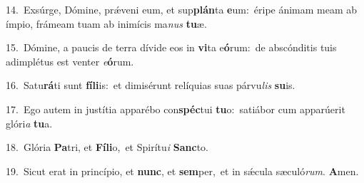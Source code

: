 {\numbfont\textcolor{\numbcolor}{14.}}~Exsúrge, Dómine, prǽveni eum, et sup\-\textbf{plán}\-ta \textbf{e}\-um:~\star éripe ánimam meam ab ímpio, frámeam tuam ab inimícis ma\textit{nus} \textbf{tu}\-æ.\par
{\numbfont\textcolor{\numbcolor}{15.}}~Dómine, a paucis de terra dívide eos in \textbf{vi}\-ta e\-\textbf{ó}\-rum:~\star de abscónditis tuis adimplétus est venter \textit{e}\-\textbf{ó}rum.\par
{\numbfont\textcolor{\numbcolor}{16.}}~Satu\-\textbf{rá}\-ti sunt \textbf{fí}\-\textbf{li}is:~\star et dimisérunt relíquias suas párvu\textit{lis} \textbf{su}\-is.\par
{\numbfont\textcolor{\numbcolor}{17.}}~Ego autem in justítia apparébo con\-\textbf{spéc}\-tui \textbf{tu}\-o:~\star satiábor cum apparúerit glóri\textit{a} \textbf{tu}\-a.\par
{\numbfont\textcolor{\numbcolor}{18.}}~Glória \textbf{Pa}\-tri, et \textbf{Fí}\-\textbf{li}o,~\star et Spirítu\textit{i} \textbf{Sanc}\-to.\par
{\numbfont\textcolor{\numbcolor}{19.}}~Sicut erat in princípio, et \textbf{nunc}\-, et \textbf{sem}\-per,~\star et in sǽcula sæculó\-\textit{rum}\-. \textbf{A}\-men.\par
